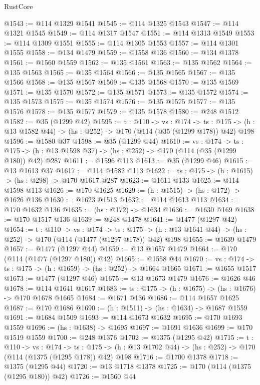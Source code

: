 \begin{lexlean}{RustCore}
\begin{coremodule}
@1543 := @114 @1329 @1541
@1545 := @114 @1325 @1543
@1547 := @114 @1321 @1545
@1549 := @114 @1317 @1547
@1551 := @114 @1313 @1549
@1553 := @114 @1309 @1551
@1555 := @114 @1305 @1553
@1557 := @114 @1301 @1555
@1558 := @134 @1479
@1559 := @1558 @136
@1560 := @134 @1378
@1561 := @1560 @1559
@1562 := @135 @1561
@1563 := @135 @1562
@1564 := @135 @1563
@1565 := @135 @1564
@1566 := @135 @1565
@1567 := @135 @1566
@1568 := @135 @1567
@1569 := @135 @1568
@1570 := @135 @1569
@1571 := @135 @1570
@1572 := @135 @1571
@1573 := @135 @1572
@1574 := @135 @1573
@1575 := @135 @1574
@1576 := @135 @1575
@1577 := @135 @1576
@1578 := @135 @1577
@1579 := @135 @1578
@1580 := @248 @1512
@1582 := @35 (@1299 @42)
@1595 := {t : @110} ->
  {vs : @174} ->
  {ts : @175} -> (h : @13 @1582 @44) -> (hs : @252) -> @170 (@114 (@35 (@1299 @178)) @42) @198
@1596 := @1580 @37
@1598 := @35 (@1299 @44)
@1610 := {vs : @174} ->
  {ts : @175} -> (h : @13 @1598 @37) -> (hs : @252) -> @170 (@114 (@35 (@1299 @180)) @42) @287
@1611 := @1596 @113
@1613 := @35 (@1299 @46)
@1615 := @13 @1613 @37
@1617 := @114 @1582 @113
@1622 := {ts : @175} -> (h : @1615) -> (hs : @298) -> @170 @1617 @287
@1623 := @1611 @133
@1625 := @114 @1598 @113
@1626 := @170 @1625
@1629 := (h : @1515) -> (hs : @172) -> @1626 @136
@1630 := @1623 @1513
@1632 := @114 @1613 @113
@1634 := @170 @1632 @136
@1635 := (hs : @172) -> @1634
@1636 := @1630 @169
@1638 := @170 @1517 @136
@1639 := @248 @1478
@1641 := @1477 (@1297 @42)
@1654 := {t : @110} ->
  {vs : @174} ->
  {ts : @175} -> (h : @13 @1641 @44) -> (hs : @252) -> @170 (@114 (@1477 (@1297 @178)) @42) @198
@1655 := @1639 @1479
@1657 := @1477 (@1297 @44)
@1659 := @13 @1657 @1479
@1664 := @170 (@114 (@1477 (@1297 @180)) @42)
@1665 := @1558 @44
@1670 := {vs : @174} -> {ts : @175} -> (h : @1659) -> (hs : @252) -> @1664 @1665
@1671 := @1655 @1517
@1673 := @1477 (@1297 @46)
@1675 := @13 @1673 @1479
@1676 := @1626 @46
@1678 := @114 @1641 @1617
@1683 := {ts : @175} -> (h : @1675) -> (hs : @1676) -> @170 @1678 @1665
@1684 := @1671 @136
@1686 := @114 @1657 @1625
@1687 := @170 @1686
@1690 := (h : @1511) -> (hs : @1634) -> @1687 @1559
@1691 := @1684 @1509
@1693 := @114 @1673 @1632
@1695 := @170 @1693 @1559
@1696 := (hs : @1638) -> @1695
@1697 := @1691 @1636
@1699 := @170 @1519 @1559
@1700 := @248 @1376
@1702 := @1375 (@1295 @42)
@1715 := {t : @110} ->
  {vs : @174} ->
  {ts : @175} -> (h : @13 @1702 @44) -> (hs : @252) -> @170 (@114 (@1375 (@1295 @178)) @42) @198
@1716 := @1700 @1378
@1718 := @1375 (@1295 @44)
@1720 := @13 @1718 @1378
@1725 := @170 (@114 (@1375 (@1295 @180)) @42)
@1726 := @1560 @44

\end{coremodule}
\end{lexlean}
